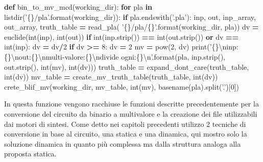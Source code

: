 \documentclass[italian,]{book}
\newenvironment{Shaded}{\begin{snugshade}}{\end{snugshade}}
\newcommand{\BuiltInTok}[1]{#1}
\newcommand{\CharTok}[1]{\textcolor[rgb]{0.31,0.60,0.02}{#1}}
\newcommand{\ControlFlowTok}[1]{\textcolor[rgb]{0.13,0.29,0.53}{\textbf{#1}}}
\newcommand{\DecValTok}[1]{\textcolor[rgb]{0.00,0.00,0.81}{#1}}
\newcommand{\KeywordTok}[1]{\textcolor[rgb]{0.13,0.29,0.53}{\textbf{#1}}}
\newcommand{\NormalTok}[1]{#1}
\newcommand{\OperatorTok}[1]{\textcolor[rgb]{0.81,0.36,0.00}{\textbf{#1}}}
\newcommand{\SpecialCharTok}[1]{\textcolor[rgb]{0.00,0.00,0.00}{#1}}
\newcommand{\StringTok}[1]{\textcolor[rgb]{0.31,0.60,0.02}{#1}}
\begin{document}
\begin{Shaded}
\begin{Highlighting}[]
\KeywordTok{def}\NormalTok{ bin_to_mv_mcd(working_dir):}
  \ControlFlowTok{for}\NormalTok{ pla }\KeywordTok{in}\NormalTok{ listdir(}\StringTok{'}\SpecialCharTok{\{\}}\StringTok{/pla'}\NormalTok{.}\BuiltInTok{format}\NormalTok{(working_dir)):}
    \ControlFlowTok{if}\NormalTok{ pla.endswith(}\StringTok{'.pla'}\NormalTok{):}
\NormalTok{      inp, out, inp_array, out_array, truth_table }\OperatorTok{=}\NormalTok{ read_pla(}
        \StringTok{'}\SpecialCharTok{\{\}}\StringTok{/pla/}\SpecialCharTok{\{\}}\StringTok{'}\NormalTok{.}\BuiltInTok{format}\NormalTok{(working_dir, pla))}
\NormalTok{      dv }\OperatorTok{=}\NormalTok{ euclide(}\BuiltInTok{int}\NormalTok{(inp), }\BuiltInTok{int}\NormalTok{(out))}
      \ControlFlowTok{if} \BuiltInTok{int}\NormalTok{(inp.strip()) }\OperatorTok{==} \BuiltInTok{int}\NormalTok{(out.strip()) }\KeywordTok{or}\NormalTok{ dv }\OperatorTok{==} \BuiltInTok{int}\NormalTok{(inp):}
\NormalTok{        dv }\OperatorTok{=}\NormalTok{ dv}\OperatorTok{/}\DecValTok{2}
      \ControlFlowTok{if}\NormalTok{ dv }\OperatorTok{>=} \DecValTok{8}\NormalTok{:}
\NormalTok{        dv }\OperatorTok{=} \DecValTok{2} 
\NormalTok{        mv }\OperatorTok{=} \BuiltInTok{pow}\NormalTok{(}\DecValTok{2}\NormalTok{, dv)}
        \BuiltInTok{print}\NormalTok{(}\StringTok{'}\SpecialCharTok{\{\}}\CharTok{\textbackslash{}n}\StringTok{inp: }\SpecialCharTok{\{\}}\CharTok{\textbackslash{}n}\StringTok{out:}\SpecialCharTok{\{\}}\CharTok{\textbackslash{}n}\StringTok{multi-valore:}\SpecialCharTok{\{\}}\CharTok{\textbackslash{}n}\StringTok{divide ogni:}\SpecialCharTok{\{\}}\CharTok{\textbackslash{}n}\StringTok{'}\NormalTok{.}\BuiltInTok{format}\NormalTok{(pla,}
\NormalTok{          inp.strip(), out.strip(), }\BuiltInTok{int}\NormalTok{(mv), }\BuiltInTok{int}\NormalTok{(dv)))}
\NormalTok{        truth_table }\OperatorTok{=}\NormalTok{ expand_dont_care(truth_table, }\BuiltInTok{int}\NormalTok{(dv))}
\NormalTok{        mv_table }\OperatorTok{=}\NormalTok{ create_mv_truth_table(truth_table, }\BuiltInTok{int}\NormalTok{(dv))}
\NormalTok{        crete_blif_mv(working_dir, mv_table, }\BuiltInTok{int}\NormalTok{(mv),}
\NormalTok{          basename(pla).split(}\StringTok{'.'}\NormalTok{)[}\DecValTok{0}\NormalTok{])}
\end{Highlighting}
\end{Shaded}

In questa funzione vengono racchiuse le funzioni descritte precedentemente per la conversione del circuito da binario a multivalore e la creazione dei file utilizzabili dai motori di sintesi. Come detto nei capitoli precedenti utilizzo 2 tecniche di conversione in base al circuito, una statica e una dinamica, qui mostro solo la soluzione dinamica in quanto più complessa ma dalla struttura analoga alla proposta statica.
\end{document}
